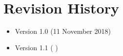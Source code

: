 \section{Revision History}
\begin{itemize}
    \item Version 1.0 (11 November 2018)
    \item Version 1.1 ( )
\end{itemize}
